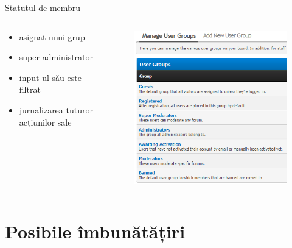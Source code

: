 \documentclass[9pt]{beamer}
\begin{document}
\begin{frame}{Statutul de membru}
  \begin{columns}
    \begin{column}[c]{0.50\textwidth}
        \begin{itemize}
		\vskip10pt
		\item asignat unui grup
		\vskip10pt
		\item super administrator
		\vskip10pt
		\item input-ul său este filtrat
		\vskip10pt
		\item jurnalizarea tuturor acțiunilor sale
	    \end{itemize}
    \end{column}
    \begin{column}[c]{0.50\textwidth}
      \begin{figure}
        \includegraphics[scale=0.4]{figures/screen4}
      \end{figure}
    \end{column}
  \end{columns}
\end{frame}

\section[]{Posibile îmbunătățiri}
\end{document}

